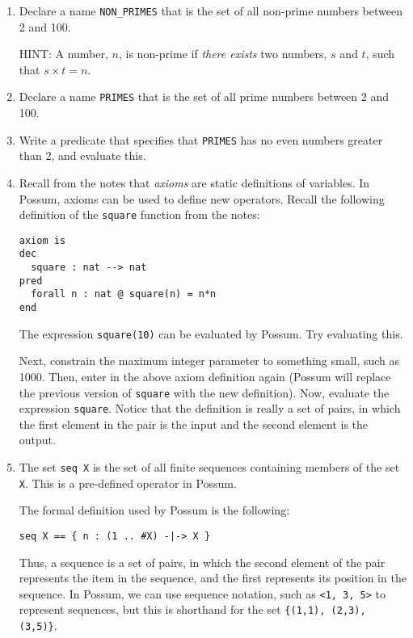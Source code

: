 \documentclass{article}
\begin{document}
\begin{enumerate}

 \item Declare a name \texttt{NON\_PRIMES} that is the set of all non-prime numbers between 2 and 100. 

  HINT: A number, $n$, is non-prime if \emph{there exists} two numbers, $s$ and $t$, such that $s \times t = n$.

 \item Declare a name \texttt{PRIMES} that is the set of all prime numbers between 2 and 100.

 \item Write a predicate that specifies that \texttt{PRIMES} has no even numbers greater than 2, and evaluate this.

 \item Recall from the notes that \emph{axioms} are static definitions of variables. In Possum, axioms can be used to define new operators. Recall the following definition of the \texttt{square} function from the notes:

\begin{lstlisting}
axiom is
dec
  square : nat --> nat
pred
  forall n : nat @ square(n) = n*n
end
\end{lstlisting}

The expression \texttt{square(10)} can be evaluated by Possum. Try evaluating this.

Next, constrain the maximum integer parameter to something small, such as 1000. Then, enter in the above axiom definition again (Possum will replace the previous version of \texttt{square} with the new definition). Now, evaluate the expression \texttt{square}. Notice that the definition is really a set of pairs, in which the first element in the pair is the input and the second element is the output.

 \item The set \texttt{seq X} is the set of all finite sequences containing members of the set \texttt{X}. This is a pre-defined operator in Possum. 

 The formal definition used by Possum is the following:

 \quad\quad \texttt{seq X == \{ n : (1 .. \#X) -|-> X \}}

 Thus, a sequence is a set of pairs, in which the second element of the pair represents the item in the sequence, and the first represents its position in the sequence. In Possum, we can use sequence notation, such as \texttt{<1, 3, 5>} to represent sequences, but this is shorthand for the set \texttt{\{(1,1), (2,3), (3,5)\}}. 


\end{enumerate}
\end{document}

